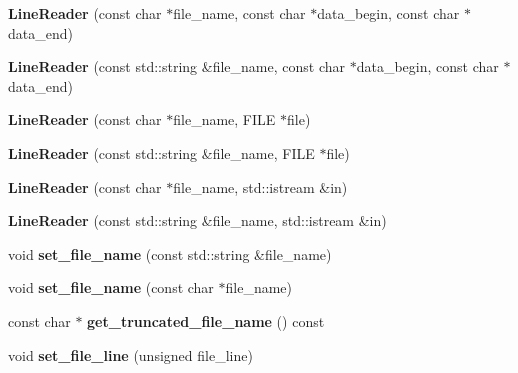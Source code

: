 \begin{DoxyCompactItemize}
{\bfseries Line\+Reader} (const char $\ast$file\+\_\+name, const char $\ast$data\+\_\+begin, const char $\ast$data\+\_\+end)
\item 
\mbox{\label{classio_1_1_line_reader_a0a52d864b46442a253443cac1367366e}} 
{\bfseries Line\+Reader} (const std\+::string \&file\+\_\+name, const char $\ast$data\+\_\+begin, const char $\ast$data\+\_\+end)
\item 
\mbox{\label{classio_1_1_line_reader_ad2a8943ba0848ae5052e2f5ad30c010e}} 
{\bfseries Line\+Reader} (const char $\ast$file\+\_\+name, F\+I\+LE $\ast$file)
\item 
\mbox{\label{classio_1_1_line_reader_a93fa2e3ae98b0e7a7391714d6395c552}} 
{\bfseries Line\+Reader} (const std\+::string \&file\+\_\+name, F\+I\+LE $\ast$file)
\item 
\mbox{\label{classio_1_1_line_reader_a301c08eb9ca5d3fdccf4e9a8e5ac82f8}} 
{\bfseries Line\+Reader} (const char $\ast$file\+\_\+name, std\+::istream \&in)
\item 
\mbox{\label{classio_1_1_line_reader_a3eacf4d1539a24122c6897fce4e72f06}} 
{\bfseries Line\+Reader} (const std\+::string \&file\+\_\+name, std\+::istream \&in)
\item 
\mbox{\label{classio_1_1_line_reader_a1a0763d491dec16cebc33134e965dfee}} 
void {\bfseries set\+\_\+file\+\_\+name} (const std\+::string \&file\+\_\+name)
\item 
\mbox{\label{classio_1_1_line_reader_a81c56ac68497da5ec874333ce063fd83}} 
void {\bfseries set\+\_\+file\+\_\+name} (const char $\ast$file\+\_\+name)
\item 
\mbox{\label{classio_1_1_line_reader_ad5817da6af1ae77daddec7aeaeebf2f8}} 
const char $\ast$ {\bfseries get\+\_\+truncated\+\_\+file\+\_\+name} () const
\item 
\mbox{\label{classio_1_1_line_reader_a581b55d4ced6adb964de50fa8ac6eb08}} 
void {\bfseries set\+\_\+file\+\_\+line} (unsigned file\+\_\+line)

\end{DoxyCompactItemize}
